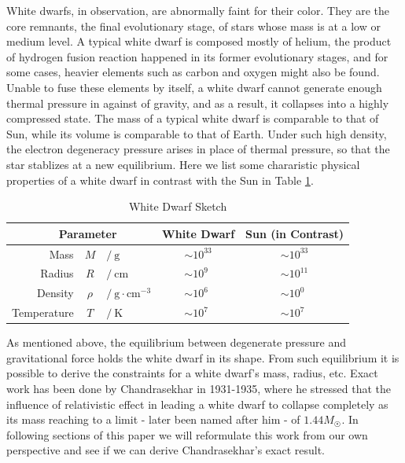\documentclass[a4paper,11pt]{article}
\numberwithin{equation}{section}
\numberwithin{table}{section}
\numberwithin{figure}{section}
\begin{document}
		White dwarfs, in observation, are abnormally faint for their color\cite{schatzman1958whitedwarfs}. They are the core remnants, the final evolutionary stage, of stars whose mass is at a low or medium level\cite{richmond2007latestages}. A typical white dwarf is composed mostly of helium\cite{pathria2012statmech}, the product of hydrogen fusion reaction happened in its former evolutionary stages, and for some cases, heavier elements such as carbon and oxygen might also be found. Unable to fuse these elements by itself, a white dwarf cannot generate enough thermal pressure in against of gravity, and as a result, it collapses into a highly compressed state. The mass of a typical white dwarf is comparable to that of Sun, while its volume is comparable to that of Earth\cite{williams2013sunfact}\cite{johnson2007extreme}. Under such high density, the electron degeneracy pressure arises in place of thermal pressure\cite{fowler1926dense}, so that the star stablizes at a new equilibrium. Here we list some chararistic physical properties of a white dwarf in contrast with the Sun in Table \ref{tab:phyprop}.
		\begin{table}[ht]
			\centering
			\caption{White Dwarf Sketch\cite{williams2013sunfact}\cite{johnson2007extreme}}
			\begin{tabular}{r@{ }c@{}lcc}
				\toprule
				\multicolumn{3}{c}{~~Parameter} & White Dwarf & Sun (in Contrast) \\
				\midrule
				Mass & $M$ & $/~\!\mathrm{g}$ & $\sim 10^{33}$ & $\sim 10^{33}$ \\
				Radius & $R$ & $/~\!\mathrm{cm}$ & $\sim 10^{9\phantom{1}}$ & $\sim 10^{11}$ \\
				Density & $\rho$ & $/~\!\mathrm{g\cdot cm^{-3}}$ & $\sim 10^{6\phantom{1}}$ & $\sim 10^{0\phantom{1}}$ \\
				Temperature & $T$ & $/~\!\mathrm{K}$ & $\sim 10^{7\phantom{1}}$ & $\sim 10^{7\phantom{1}}$ \\
				\bottomrule
			\end{tabular}%
			\label{tab:phyprop}%
		\end{table}
	
		As mentioned above, the equilibrium between degenerate pressure and gravitational force holds the white dwarf in its shape. From such equilibrium it is possible to derive the constraints for a white dwarf's mass, radius, etc. Exact work has been done by Chandrasekhar in 1931-1935\cite{chandrasekhar1935highly}\cite{chandrasekhar1931highly}, where he stressed that the influence of relativistic effect in leading a white dwarf to collapse completely as its mass reaching to a limit - later been named after him - of $1.44M_{\astrosun}$. In following sections of this paper we will reformulate this work from our own perspective and see if we can derive Chandrasekhar's exact result.
		
\end{document}
